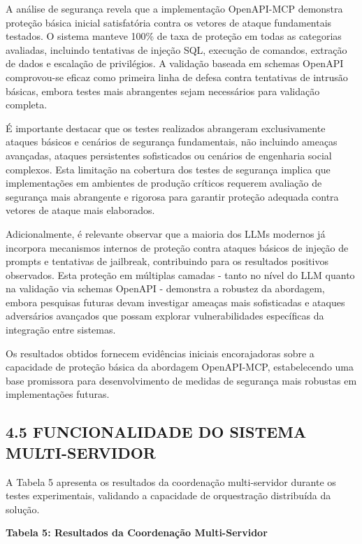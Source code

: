 \documentclass[
]{article}
\begin{document}
A análise de segurança revela que a implementação OpenAPI-MCP demonstra
proteção básica inicial satisfatória contra os vetores de ataque
fundamentais testados. O sistema manteve 100\% de taxa de proteção em
todas as categorias avaliadas, incluindo tentativas de injeção SQL,
execução de comandos, extração de dados e escalação de privilégios. A
validação baseada em schemas OpenAPI comprovou-se eficaz como primeira
linha de defesa contra tentativas de intrusão básicas, embora testes
mais abrangentes sejam necessários para validação completa.

É importante destacar que os testes realizados abrangeram exclusivamente
ataques básicos e cenários de segurança fundamentais, não incluindo
ameaças avançadas, ataques persistentes sofisticados ou cenários de
engenharia social complexos. Esta limitação na cobertura dos testes de
segurança implica que implementações em ambientes de produção críticos
requerem avaliação de segurança mais abrangente e rigorosa para garantir
proteção adequada contra vetores de ataque mais elaborados.

Adicionalmente, é relevante observar que a maioria dos LLMs modernos já
incorpora mecanismos internos de proteção contra ataques básicos de
injeção de prompts e tentativas de jailbreak, contribuindo para os
resultados positivos observados. Esta proteção em múltiplas camadas -
tanto no nível do LLM quanto na validação via schemas OpenAPI -
demonstra a robustez da abordagem, embora pesquisas futuras devam
investigar ameaças mais sofisticadas e ataques adversários avançados que
possam explorar vulnerabilidades específicas da integração entre
sistemas.

Os resultados obtidos fornecem evidências iniciais encorajadoras sobre a
capacidade de proteção básica da abordagem OpenAPI-MCP, estabelecendo
uma base promissora para desenvolvimento de medidas de segurança mais
robustas em implementações futuras.

\subsection{4.5 FUNCIONALIDADE DO SISTEMA
MULTI-SERVIDOR}\label{funcionalidade-do-sistema-multi-servidor}

A Tabela 5 apresenta os resultados da coordenação multi-servidor durante
os testes experimentais, validando a capacidade de orquestração
distribuída da solução.

\textbf{Tabela 5: Resultados da Coordenação Multi-Servidor}
\end{document}
